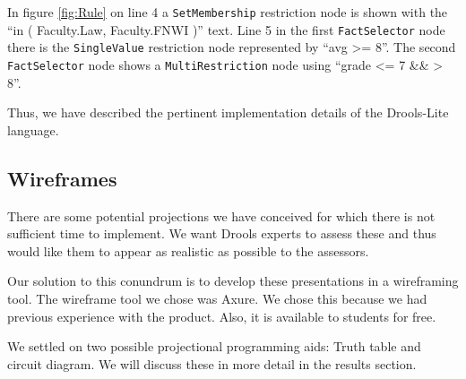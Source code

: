 In figure \ref{fig:Rule} on line 4 a \texttt{SetMembership} restriction node is shown with the ``in ( Faculty.Law, Faculty.FNWI )'' text.
Line 5 in the first \texttt{FactSelector} node there is the \texttt{SingleValue} restriction node represented by ``avg >= 8''.
The second \texttt{FactSelector} node shows a \texttt{MultiRestriction} node using ``grade <= 7 \&\& > 8''.

Thus, we have described the pertinent implementation details of the Drools-Lite language.

\subsection{Wireframes}

There are some potential projections we have conceived for which there is not sufficient time to implement.
We want Drools experts to assess these and thus would like them to appear as realistic as possible to the assessors.

Our solution to this conundrum is to develop these presentations in a wireframing tool.
The wireframe tool we chose was Axure\cite{Axure_ProductPage}.
We chose this because we had previous experience with the product.
Also, it is available to students for free.

We settled on two possible projectional programming aids: Truth table and circuit diagram.
We will discuss these in more detail in the results section.
